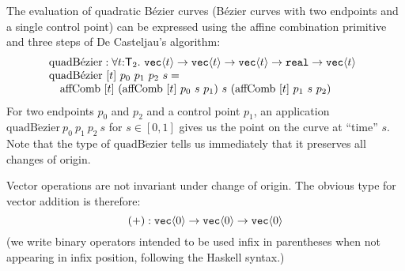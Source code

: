 \begin{example}
  The evaluation of quadratic B\'{e}zier curves (B\'{e}zier curves
  with two endpoints and a single control point) can be expressed
  using the affine combination primitive and three steps of De
  Casteljau's algorithm:
  \begin{displaymath}
    \begin{array}{@{}l}
      \mathrm{quadB\acute{e}zier} : \forall t \mathord:\SynTransl_2.\ \tyPrim{vec}{t} \to \tyPrim{vec}{t} \to \tyPrim{vec}{t} \to \tyPrimNm{real} \to \tyPrim{vec}{t} \\
      \mathrm{quadB\acute{e}zier}\ [t]\ p_0\ p_1\ p_2\ s = \\
      \quad \mathrm{affComb}\ [t]\ (\mathrm{affComb}\ [t]\ p_0\ s\ p_1)\ s\ (\mathrm{affComb}\ [t]\ p_1\ s\ p_2) \\
    \end{array}
  \end{displaymath}
  For two endpoints $p_0$ and $p_2$ and a control point $p_1$, an
  application $\mathrm{quadB\acute{e}zier}\ p_0\ p_1\ p_2\ s$ for $s
  \in [0,1]$ gives us the point on the curve at ``time'' $s$. Note
  that the type of $\mathrm{quadB\acute{e}zier}$ tells us immediately
  that it preserves all changes of origin.
\end{example}



Vector operations are not invariant under change of origin. The
obvious type for vector addition is therefore:
\begin{displaymath}
  (+) : \texttt{vec}\langle 0 \rangle \to \texttt{vec}\langle 0 \rangle \to \texttt{vec}\langle 0 \rangle
\end{displaymath}
(we write binary operators intended to be used infix in parentheses
when not appearing in infix position, following the Haskell
syntax.)

